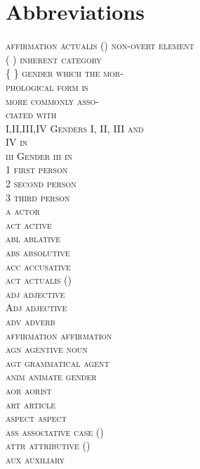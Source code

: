 \documentclass[output=collectionpaper]{langsci/langscibook}
\begin{document}
\section*{Abbreviations}
\begin{multicols}{2}
\begin{tabbing}\relax
\scshape affirmation  \= actualis ()\kill
[ ]	\>	non-overt element	\\
( )	\>	inherent category	\\
\{ \}	\>	gender which the mor-\\
        \>  phological form is\\
        \> more commonly asso-\\
        \> ciated with	\\
I,II,III,IV	\>	Genders I, II, III and\\
            \> IV in \\
\scshape iii	\>	Gender \textsc{iii} in 	\\
1	\>	first person	\\
2	\>	second person	\\
3	\>	third person	\\
\scshape a	\>	actor	\\
\scshape act	\>	active	\\
\scshape abl	\>	ablative	\\
\scshape abs	\>	absolutive	\\
\scshape acc	\>	accusative	\\
\scshape act	\>	actualis ()	\\
\scshape adj	\>	adjective	\\
\normalfont Adj	\>	adjective	\\
\scshape adv	\>	adverb	\\
\scshape affirmation	\>	affirmation	\\
\scshape agn	\>	agentive noun	\\
\scshape agt	\>	grammatical agent	\\
\scshape anim	\>	animate gender	\\
\scshape aor	\>	aorist	\\
\scshape art	\>	article	\\
\scshape aspect	\>	aspect	\\
\scshape ass	\>	associative case ()	\\
\scshape attr	\>	attributive ()	\\
\scshape aux	\>	auxiliary	\\

\end{tabbing}
\end{multicols}
\end{document}
